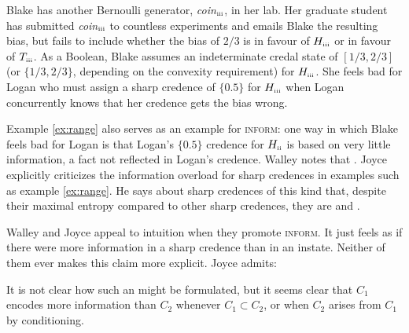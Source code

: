 \documentclass[11pt]{article}
\begin{document}
\begin{quotex}
  \label{ex:incomp} Blake has another Bernoulli
  generator, \textit{coin}$_{\mbox{\tiny{iii}}}$, in her lab. Her
  graduate student has submitted \textit{coin}$_{\mbox{\tiny{iii}}}$
  to countless experiments and emails Blake the resulting bias, but
  fails to include whether the bias of $2/3$ is in favour of
  $H_{\mbox{\tiny{iii}}}$ or in favour of $T_{\mbox{\tiny{iii}}}$. As
  a Boolean, Blake assumes an indeterminate credal state of
  $[1/3,2/3]$ (or $\{1/3,2/3\}$, depending on the convexity
  requirement) for $H_{\mbox{\tiny{iii}}}$. She feels bad for Logan
  who must assign a sharp credence of $\{0.5\}$ for
  $H_{\mbox{\tiny{iii}}}$ when Logan concurrently knows that her
  credence gets the bias wrong.
\end{quotex}

Example \ref{ex:range} also serves as an example for \textsc{inform}:
one way in which Blake feels bad for Logan is that Logan's $\{0.5\}$
credence for $H_{\mbox{\tiny{ii}}}$ is based on very little
information, a fact not reflected in Logan's credence. Walley notes
that 
. Joyce explicitly criticizes the information
overload for sharp credences in examples such as example
\ref{ex:range}. He says about sharp credences of this kind that,
despite their maximal entropy compared to other sharp credences, they
are  and  .

Walley and Joyce appeal to intuition when they promote
\textsc{inform}. It just feels as if there were more information in a
sharp credence than in an instate. Neither of them ever makes this
claim more explicit. Joyce admits:

\begin{quotex}
  It is not clear how such an  might be formulated, but it seems clear that $C_{1}$
  encodes more information than $C_{2}$ whenever
  $C_{1}\subset{}C_{2}$, or when $C_{2}$ arises from $C_{1}$ by
  conditioning. 
\end{quotex}
\end{document}

